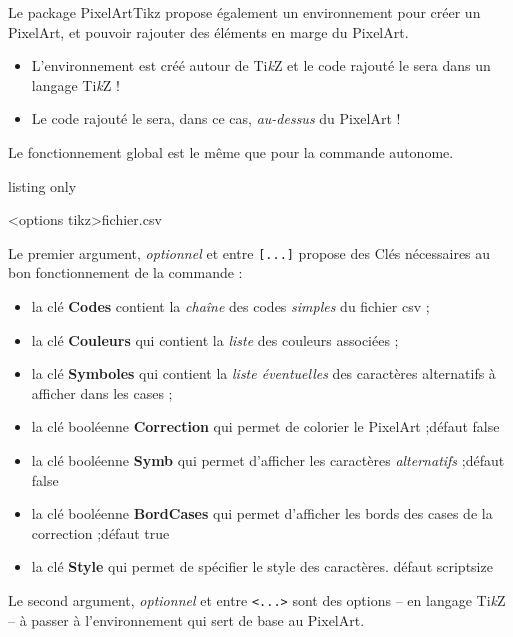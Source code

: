 \documentclass{article}
\newcommand\Cle[1]{{\bfseries\sffamily\textlangle #1\textrangle}}
\begin{document}
Le package \textsf{PixelArtTikz} propose également un environnement pour créer un PixelArt, et pouvoir rajouter des éléments en marge du PixelArt.

\begin{itemize}
	\item L'environnement est créé autour de Ti\textit{k}Z et le code rajouté le sera dans un langage Ti\textit{k}Z !
	\item Le code rajouté le sera, dans ce cas, \textit{au-dessus} du PixelArt !
\end{itemize}

Le fonctionnement global est le même que pour la commande autonome.

\begin{PresentationCode}{listing only}
	\begin{EnvPixelArtTikz}[clés]<options tikz>{fichier.csv}
	\end{EnvPixelArtTikz}
\end{PresentationCode}

Le premier argument, \textit{optionnel} et entre \texttt{[...]} propose des \textsf{Clés} nécessaires au bon fonctionnement de la commande :

\begin{itemize}
	\item la clé \Cle{Codes} contient la \textit{chaîne} des codes \textit{simples} du  fichier \textsf{csv} ;
	\item la clé \Cle{Couleurs} qui contient la \textit{liste} des couleurs associées ;
	\item la clé \Cle{Symboles} qui contient la \textit{liste éventuelles} des caractères alternatifs à afficher dans les cases ;
	\item la clé booléenne \Cle{Correction} qui permet de colorier le PixelArt ;\hfill{}défaut \textsf{false}
	\item la clé booléenne \Cle{Symb} qui permet d'afficher les caractères \textit{alternatifs} ;\hfill{}défaut \textsf{false}
	\item la clé booléenne \Cle{BordCases} qui permet d'afficher les bords des cases de la correction ;\hfill{}défaut \textsf{true}
	\item la clé \Cle{Style} qui permet de spécifier le style des caractères. \hfill{}défaut \textsf{scriptsize}
\end{itemize}

Le second argument, \textit{optionnel} et entre \texttt{<...>} sont des options -- en langage Ti\textit{k}Z -- à passer à l'environnement qui sert de base au PixelArt.
\end{document}
